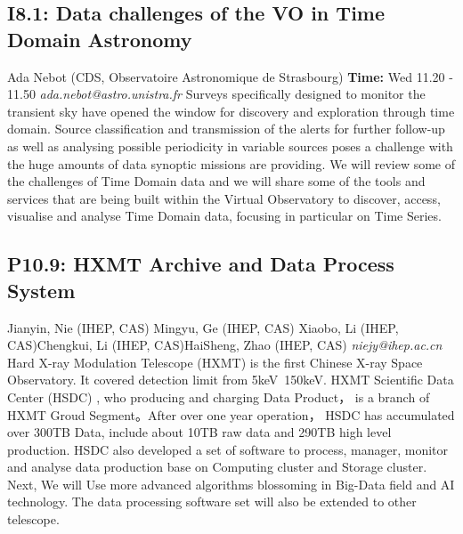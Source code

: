 \documentclass{report}
\begin{document}
\subsection*{I8.1: Data challenges of the VO in Time Domain Astronomy}
\bigskip
Ada Nebot (CDS, Observatoire Astronomique de Strasbourg) \newline   \newline   \newline   \newline  \newline  \newline\newline
{\bf Time:} Wed 11.20 - 11.50\newline
\newline
{\it ada.nebot@astro.unistra.fr}\newline
\newline\newline
Surveys specifically designed to monitor the transient sky have opened the window for discovery and exploration through time domain. Source classification and transmission of the alerts for further follow-up as well as analysing possible periodicity in variable sources poses a challenge with the huge amounts of data synoptic missions are providing. We will review some of the challenges of Time Domain data and we will share some of the tools and services that are being built within the Virtual Observatory to discover, access, visualise and analyse Time Domain data, focusing in particular on Time Series.\newline
\newpage
\subsection*{P10.9: HXMT Archive and Data Process System}
\bigskip
Jianyin, Nie (IHEP, CAS) \newline Mingyu, Ge (IHEP, CAS) \newline  Xiaobo, Li (IHEP, CAS)\newline  Chengkui, Li (IHEP, CAS)\newline HaiSheng, Zhao (IHEP, CAS)\newline  \newline\newline
{\it niejy@ihep.ac.cn}\newline
\newline\newline
Hard X-ray Modulation Telescope (HXMT) is the first Chinese X-ray Space Observatory. It covered detection limit from 5keV~150keV. HXMT Scientific Data Center (HSDC) , who producing and charging Data Product， is a branch of HXMT Groud Segment。After over one year operation， HSDC has accumulated over 300TB Data, include  about 10TB raw data and 290TB high level production. HSDC also developed a set of software to process, manager, monitor and analyse data production base on Computing cluster and Storage cluster. Next, We will Use more advanced algorithms blossoming in Big-Data field and AI technology. The data processing software set will also be extended to other telescope.\newline
\newpage
\end{document}
